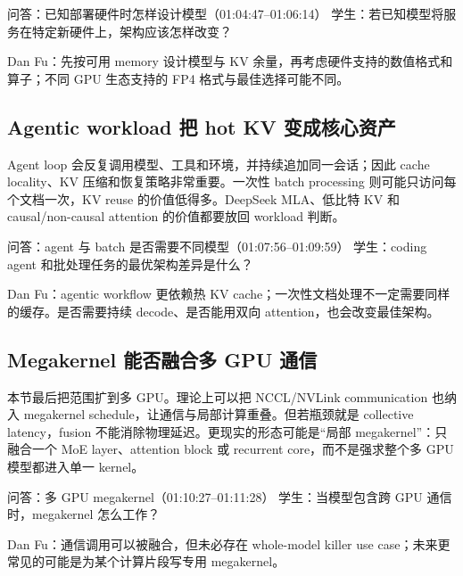 \begin{dialoguebox}{问答：已知部署硬件时怎样设计模型（01:04:47--01:06:14）}
学生：若已知模型将服务在特定新硬件上，架构应该怎样改变？\par
Dan Fu：先按可用 memory 设计模型与 KV 余量，再考虑硬件支持的数值格式和算子；不同 GPU 生态支持的 FP4 格式与最佳选择可能不同。
\end{dialoguebox}


\subsection{Agentic workload 把 hot KV 变成核心资产}

Agent loop 会反复调用模型、工具和环境，并持续追加同一会话；因此 cache locality、KV 压缩和恢复策略非常重要。一次性 batch processing 则可能只访问每个文档一次，KV reuse 的价值低得多。DeepSeek MLA、低比特 KV 和 causal/non-causal attention 的价值都要放回 workload 判断。

\begin{dialoguebox}{问答：agent 与 batch 是否需要不同模型（01:07:56--01:09:59）}
学生：coding agent 和批处理任务的最优架构差异是什么？\par
Dan Fu：agentic workflow 更依赖热 KV cache；一次性文档处理不一定需要同样的缓存。是否需要持续 decode、是否能用双向 attention，也会改变最佳架构。
\end{dialoguebox}


\subsection{Megakernel 能否融合多 GPU 通信}

本节最后把范围扩到多 GPU。理论上可以把 NCCL/NVLink communication 也纳入 megakernel schedule，让通信与局部计算重叠。但若瓶颈就是 collective latency，fusion 不能消除物理延迟。更现实的形态可能是“局部 megakernel”：只融合一个 MoE layer、attention block 或 recurrent core，而不是强求整个多 GPU 模型都进入单一 kernel。

\begin{dialoguebox}{问答：多 GPU megakernel（01:10:27--01:11:28）}
学生：当模型包含跨 GPU 通信时，megakernel 怎么工作？\par
Dan Fu：通信调用可以被融合，但未必存在 whole-model killer use case；未来更常见的可能是为某个计算片段写专用 megakernel。
\end{dialoguebox}

